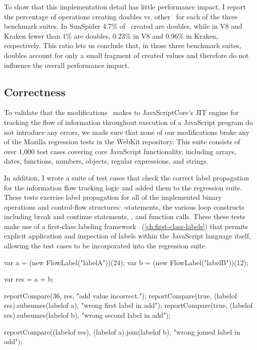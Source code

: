 To show that this implementation detail has little performance impact, I report the percentage of operations creating doubles vs. other \jsvalues\ for each of the three benchmark suites.
In SunSpider 4.7\% of \jsvalues\ created are doubles, while in V8 and Kraken fewer than 1\% are doubles, 0.23\% in V8 and 0.96\% in Kraken, respectively.
This ratio lets us conclude that, in those three benchmark suites, doubles account for only a small fragment of created values and therefore do not influence the overall performance impact.

\subsection{Correctness}
\label{sec:jitflow-evaluation-correctness}

To validate that the modifications \JitFlow\ makes to JavaScriptCore's JIT engine for tracking the flow of information throughout execution of a JavaScript program do not introduce any errors, we made sure that none of our modifications broke any of the Mozilla regression tests in the WebKit repository.
This suite consists of over 1,000 test cases covering core JavaScript functionality, including arrays, dates, functions, numbers, objects, regular expressions, and strings.

In addition, I wrote a suite of test cases that check the correct label propagation for the information flow tracking logic and added them to the regression suite.
These tests exercise label propagation for all of the implemented binary operations and control-flow structures: -statements, the various loop constructs including break and continue statements, , and function calls.
These these tests make use of a first-class labeling framework~\cite{hennigan.etal+13} (\autoref{ch:first-class-labels}) that permits explicit application and inspection of labels within the JavaScript language itself, allowing the test cases to be incorporated into the regression suite.

\begin{jscode}
var a = (new FlowLabel("labelA"))(24);
var b = (new FlowLabel("labelB"))(12);

var res = a + b;

reportCompare(36, res, "add value incorrect.");
reportCompare(true, (labelof res).subsumes(labelof a),
              "wrong first label in add");
reportCompare(true, (labelof res).subsumes(labelof b),
              "wrong second label in add");

reportCompare((labelof res), (labelof a).join(labelof b),
              "wrong joined label in add");
\end{jscode}

